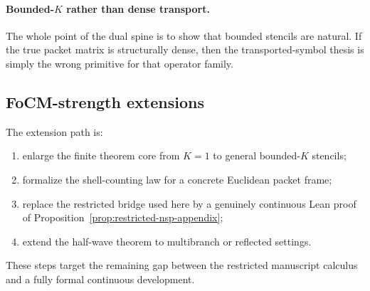 \paragraph{Bounded-$K$ rather than dense transport.}
The whole point of the dual spine is to show that bounded stencils are natural. If the true packet matrix is structurally dense, then the transported-symbol thesis is simply the wrong primitive for that operator family.

\subsection{FoCM-strength extensions}

The extension path is:
\begin{enumerate}
\item enlarge the finite theorem core from $K=1$ to general bounded-$K$ stencils;
\item formalize the shell-counting law for a concrete Euclidean packet frame;
\item replace the restricted bridge used here by a genuinely continuous Lean proof of Proposition~\ref{prop:restricted-nsp-appendix};
\item extend the half-wave theorem to multibranch or reflected settings.
\end{enumerate}
These steps target the remaining gap between the restricted manuscript calculus and a fully formal continuous development.
